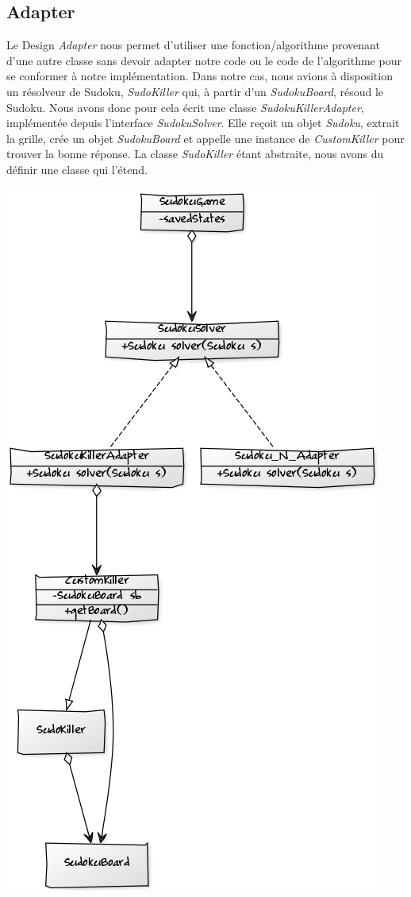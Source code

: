 \documentclass[a4paper]{article}
\begin{document}
\subsection{Adapter}
Le Design \textit{Adapter} nous permet d'utiliser une fonction/algorithme provenant d'une autre classe sans devoir adapter notre code ou le code de l'algorithme pour se conformer à notre implémentation.
Dans notre cas, nous avions à disposition un résolveur de Sudoku, \textit{SudoKiller} qui, à partir d'un \textit{SudokuBoard}, résoud le Sudoku.
Nous avons donc pour cela écrit une classe \textit{SudokuKillerAdapter}, implémentée depuis l'interface \textit{SudokuSolver}. Elle reçoit un objet \textit{Sudoku}, extrait la grille, crée un objet \textit{SudokuBoard} et appelle une instance de \textit{CustomKiller} pour trouver la bonne réponse.
La classe \textit{SudoKiller} étant abstraite, nous avons du définir une classe qui l'étend.
\begin{center}
\includegraphics[scale=0.7]{../diagrams/adapter.png}
\end{center}
\end{document}

